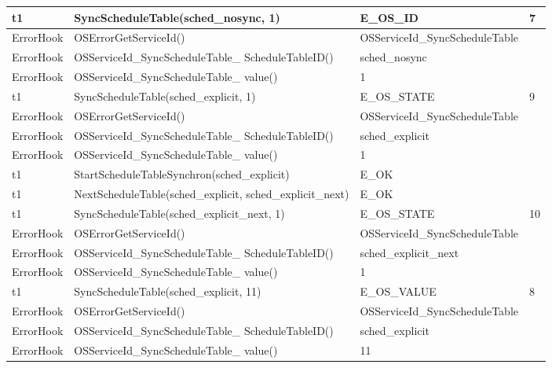 \documentclass[10pt]{article}
\newlength{\Li}\settowidth{\Li}{Running}
\newlength{\Lii}\setlength{\Lii}{7cm}
\newlength{\Liiii}\setlength{\Liiii}{0.9cm}
\newlength{\Liii}\setlength{\Liii}{\textwidth} \addtolength{\Liii}{-\Li} \addtolength{\Liii}{-\Lii} \addtolength{\Liii}{-\Liiii}
\begin{document}
\begin{supertabular}{|p{\Li}|p{\Lii}|p{\Liii}|p{\Liiii}|}
	t1		& SyncScheduleTable(sched\_nosync, 1)									& E\_OS\_ID										& 7 \\ \hline
	ErrorHook	& OSErrorGetServiceId()												& OSServiceId\_SyncScheduleTable					& \\ \hline
	ErrorHook	& OSServiceId\_SyncScheduleTable\_ ScheduleTableID()					& sched\_nosync									& \\ \hline
	ErrorHook	& OSServiceId\_SyncScheduleTable\_ value()								& 1												& \\ \hline

	t1		& SyncScheduleTable(sched\_explicit, 1)									& E\_OS\_STATE									& 9 \\ \hline
	ErrorHook	& OSErrorGetServiceId()												& OSServiceId\_SyncScheduleTable					& \\ \hline
	ErrorHook	& OSServiceId\_SyncScheduleTable\_ ScheduleTableID()					& sched\_explicit									& \\ \hline
	ErrorHook	& OSServiceId\_SyncScheduleTable\_ value()								& 1												& \\ \hline

	t1		& StartScheduleTableSynchron(sched\_explicit)							& E\_OK											& \\ \hline
		
	t1		& NextScheduleTable(sched\_explicit, sched\_explicit\_next)					& E\_OK											& \\ \hline
	
	t1		& SyncScheduleTable(sched\_explicit\_next, 1)							& E\_OS\_STATE									& 10 \\ \hline
	ErrorHook	& OSErrorGetServiceId()												& OSServiceId\_SyncScheduleTable					& \\ \hline
	ErrorHook	& OSServiceId\_SyncScheduleTable\_ ScheduleTableID()					& sched\_explicit\_next								& \\ \hline
	ErrorHook	& OSServiceId\_SyncScheduleTable\_ value()								& 1												& \\ \hline

	t1		& SyncScheduleTable(sched\_explicit, 11)								& E\_OS\_VALUE									& 8 \\ \hline
	ErrorHook	& OSErrorGetServiceId()												& OSServiceId\_SyncScheduleTable					& \\ \hline
	ErrorHook	& OSServiceId\_SyncScheduleTable\_ ScheduleTableID()					& sched\_explicit									& \\ \hline
	ErrorHook	& OSServiceId\_SyncScheduleTable\_ value()								& 11												& \\ \hline


\end{supertabular}
\end{document}
